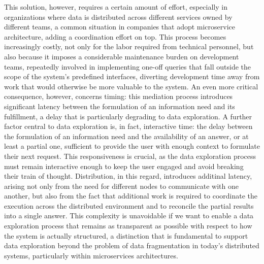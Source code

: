 This solution, however, requires a certain amount of effort, especially in
organizations where data is distributed across different services owned by
different teams, a common situation in companies that adopt microservice
architecture, adding a coordination effort on top. This process becomes
increasingly costly, not only for the labor required from technical personnel,
but also because it imposes a considerable maintenance burden on development teams,
repeatedly involved in implementing one-off queries that fall outside the
scope of the system's predefined interfaces, diverting development time away
from work that would otherwise be more valuable to the system.
An even more critical consequence, however, concerns timing: this mediation
process introduces significant latency between the formulation of an
information need and its fulfillment, a delay that is particularly
degrading to data exploration. A further factor central to data exploration
is, in fact, interactive time: the delay between the formulation of an
information need and the availability of an answer, or at least a partial
one, sufficient to provide the user with enough context to formulate their
next request. This responsiveness is crucial, as the data exploration process
must remain interactive enough to keep the user engaged and avoid breaking
their train of thought. Distribution, in this regard, introduces additinal
latency, arising not only from the need for different nodes to communicate with
one another, but also from the fact that additional work is required to
coordinate the execution across the distributed environment and to reconcile the
partial results into a single answer. This complexity is unavoidable if we want
to enable a data exploration process that remains as transparent as possible
with respect to how the system is actually structured, a distinction that is
fundamental to support data exploration beyond the problem of data fragmentation
in today's distributed systems, particularly within microservices architectures.

